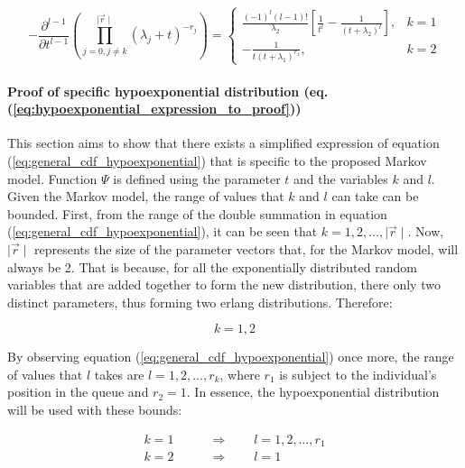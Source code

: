 \begin{equation} \label{eq:hypoexponential_expression_to_proof}
    - \frac{\partial^{l - 1}}{\partial t ^{l - 1}}
    \left(
        \prod_{j = 0, j \neq k}^{\mid \vec{r} \mid} (\lambda_j + t)^{-r_j}
    \right) =
    \begin{cases}
        \frac{(-1)^{l} (l-1)!}{\lambda_2} \left[\frac{1}{t^l} - \frac{1}
        {(t + \lambda_2)^l}\right] , & k=1 \\
        - \frac{1}{t (t + \lambda_1)^{r_1}}, & k=2
    \end{cases}
\end{equation}



\paragraph{Proof of specific hypoexponential distribution
(eq. (\ref{eq:hypoexponential_expression_to_proof}))}

This section aims to show that there exists a simplified expression of equation
(\ref{eq:general_cdf_hypoexponential}) that is specific to the proposed Markov
model.
Function \(\Psi\) is defined using the parameter \(t\) and the variables \(k\)
and \(l\).
Given the Markov model, the range of values that \(k\) and \(l\) can take can be
bounded.
First, from the range of the double summation in equation
(\ref{eq:general_cdf_hypoexponential}), it can be seen that
\(k = 1, 2, \dots, \mid \vec{r} \mid\).
Now, \(\mid \vec{r} \mid\) represents the size of the parameter vectors that,
for the Markov model, will always be 2.
That is because, for all the exponentially distributed random variables that are
added together to form the new distribution, there only two distinct parameters,
thus forming two erlang distributions. Therefore:

\begin{equation*}
    k = 1, 2
\end{equation*}

By observing equation (\ref{eq:general_cdf_hypoexponential}) once more, the range
of values that \(l\) takes are \(l = 1, 2, \dots, r_k\), where \(r_1\) is
subject to the individual's position in the queue and \(r_2 = 1\).
In essence, the hypoexponential distribution will be used with these bounds:

\begin{align}
    k = 1 & \qquad \Rightarrow \qquad l = 1, 2, \dots, r_1 \nonumber \\
    k = 2 & \qquad \Rightarrow \qquad l = 1
\end{align}

